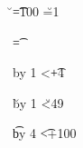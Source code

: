 \documentclass[a4paper, 11pt]{article}
\begin{document}

\newcount\p
\newcount\u
\newcount\t

\t=100
\u=1

\loop
    \p=\the\t

    {\loop
        {\loop
            
        \advance\p by 1
        \ifnum\p<\numexpr\t+4
        \repeat}

    \advance\u by 1
    \ifnum\u<49
    \repeat}

    \advance\t by 4
\ifnum\t<\numexpr\timy+100
\repeat
\end{document}
